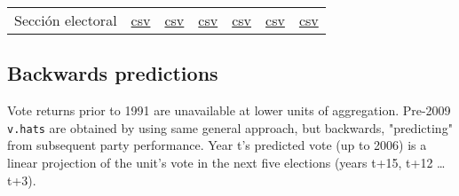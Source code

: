\documentclass[11pt]{article}
\begin{document}
\begin{center}
\begin{tabular}{lllllll}
Sección electoral & \href{./data/v-hats-etc/sec/dipfed-seccion-vhat-2009.csv}{csv} & \href{./data/v-hats-etc/sec/dipfed-seccion-vhat-2012.csv}{csv} & \href{./data/v-hats-etc/sec/dipfed-seccion-vhat-2015.csv}{csv} & \href{./data/v-hats-etc/sec/dipfed-seccion-vhat-2018.csv}{csv} & \href{./data/v-hats-etc/sec/dipfed-seccion-vhat-2021.csv}{csv} & \href{./data/v-hats-etc/sec/dipfed-seccion-vhat-2024.csv}{csv}\\
\end{tabular}
\end{center}
\subsection{Backwards predictions}
\label{sec:orgf78908d}
Vote returns prior to 1991 are unavailable at lower units of aggregation. Pre-2009 \texttt{v.hats} are obtained by using same general approach, but backwards, "predicting" from subsequent party performance. Year t's predicted vote (up to 2006) is a linear projection of the unit's vote in the next five elections (years t+15, t+12 \ldots{} t+3). 
\end{document}
